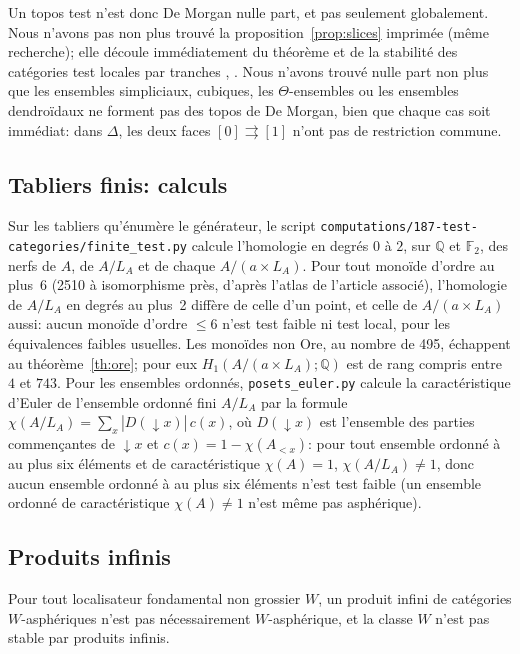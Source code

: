 Un topos test n'est donc De Morgan nulle part, et pas seulement globalement. Nous n'avons pas non plus trouvé la proposition~\ref{prop:slices} imprimée (même recherche); elle découle immédiatement du théorème et de la stabilité des catégories test locales par tranches \cite[prop.~4.1.14 (v)]{cisinski-308}, \cite[rem.~1.5.4 b)]{maltsiniotis-301}. Nous n'avons trouvé nulle part non plus que les ensembles simpliciaux, cubiques, les $\Theta$-ensembles ou les ensembles dendroïdaux ne forment pas des topos de De Morgan, bien que chaque cas soit immédiat: dans $\Delta$, les deux faces $[0]\rightrightarrows[1]$ n'ont pas de restriction commune.

\subsection{Tabliers finis: calculs}

Sur les tabliers qu'énumère le générateur, le script \nolinkurl{computations/187-test-categories/finite_test.py} calcule l'homologie en degrés $0$ à $2$, sur $\mathbb Q$ et $\mathbb F_2$, des nerfs de $A$, de $A/L_A$ et de chaque $A/(a\times L_A)$. Pour tout monoïde d'ordre au plus~6 (2510 à isomorphisme près, d'après l'atlas de l'article associé), l'homologie de $A/L_A$ en degrés au plus~2 diffère de celle d'un point, et celle de $A/(a\times L_A)$ aussi: aucun monoïde d'ordre $\le 6$ n'est test faible ni test local, pour les équivalences faibles usuelles. Les monoïdes non Ore, au nombre de 495, échappent au théorème~\ref{th:ore}; pour eux $H_1(A/(a\times L_A);\mathbb Q)$ est de rang compris entre $4$ et $743$. Pour les ensembles ordonnés, \nolinkurl{posets_euler.py} calcule la caractéristique d'Euler de l'ensemble ordonné fini $A/L_A$ par la formule $\chi(A/L_A) = \sum_x |D(\downarrow x)|\,c(x)$, où $D(\downarrow x)$ est l'ensemble des parties commençantes de $\downarrow x$ et $c(x) = 1-\chi(A_{<x})$: pour tout ensemble ordonné à au plus six éléments et de caractéristique $\chi(A)=1$, $\chi(A/L_A)\ne1$, donc aucun ensemble ordonné à au plus six éléments n'est test faible (un ensemble ordonné de caractéristique $\chi(A)\ne1$ n'est même pas asphérique).


\subsection{Produits infinis}

\begin{proposition}\label{prop:products}
Pour tout localisateur fondamental non grossier $W$, un produit infini de catégories $W$-asphériques n'est pas nécessairement $W$-asphérique, et la classe $W$ n'est pas stable par produits infinis.
\end{proposition}

